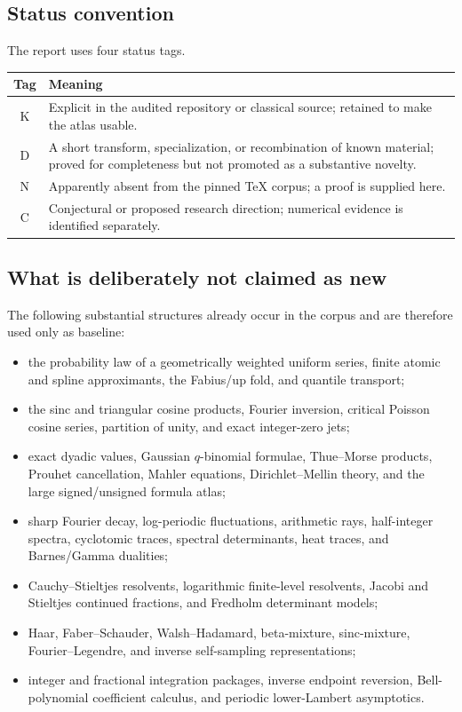 \documentclass[11pt,oneside]{article}
\numberwithin{equation}{section}
\theoremstyle{definition}
\theoremstyle{remark}
\newcommand{\statusknown}{\textcolor{deepviolet}{\textsf{K}}}
\newcommand{\statusderived}{\textcolor{derivedblue}{\textsf{D}}}
\newcommand{\statusnew}{\textcolor{provedgreen}{\textsf{N}}}
\newcommand{\statusconj}{\textcolor{frontierorange}{\textsf{C}}}
\begin{document}
\subsection{Status convention}

The report uses four status tags.
\begin{center}
\begin{tabularx}{0.94\textwidth}{@{}cX@{}}
\toprule
Tag & Meaning \\
\midrule
\statusknown & Explicit in the audited repository or classical source; retained to make the atlas usable.\\
\statusderived & A short transform, specialization, or recombination of known material; proved for completeness but not promoted as a substantive novelty.\\
\statusnew & Apparently absent from the pinned TeX corpus; a proof is supplied here.\\
\statusconj & Conjectural or proposed research direction; numerical evidence is identified separately.\\
\bottomrule
\end{tabularx}
\end{center}

\subsection{What is deliberately not claimed as new}

The following substantial structures already occur in the corpus and are
therefore used only as baseline:
\begin{itemize}
\item the probability law of a geometrically weighted uniform series, finite
      atomic and spline approximants, the Fabius/up fold, and quantile transport;
\item the sinc and triangular cosine products, Fourier inversion, critical
      Poisson cosine series, partition of unity, and exact integer-zero jets;
\item exact dyadic values, Gaussian $q$-binomial formulae, Thue--Morse products,
      Prouhet cancellation, Mahler equations, Dirichlet--Mellin theory, and the
      large signed/unsigned formula atlas;
\item sharp Fourier decay, log-periodic fluctuations, arithmetic rays,
      half-integer spectra, cyclotomic traces, spectral determinants, heat
      traces, and Barnes/Gamma dualities;
\item Cauchy--Stieltjes resolvents, logarithmic finite-level resolvents, Jacobi
      and Stieltjes continued fractions, and Fredholm determinant models;
\item Haar, Faber--Schauder, Walsh--Hadamard, beta-mixture, sinc-mixture,
      Fourier--Legendre, and inverse self-sampling representations;
\item integer and fractional integration packages, inverse endpoint reversion,
      Bell-polynomial coefficient calculus, and periodic lower-Lambert
      asymptotics.
\end{itemize}
\end{document}
